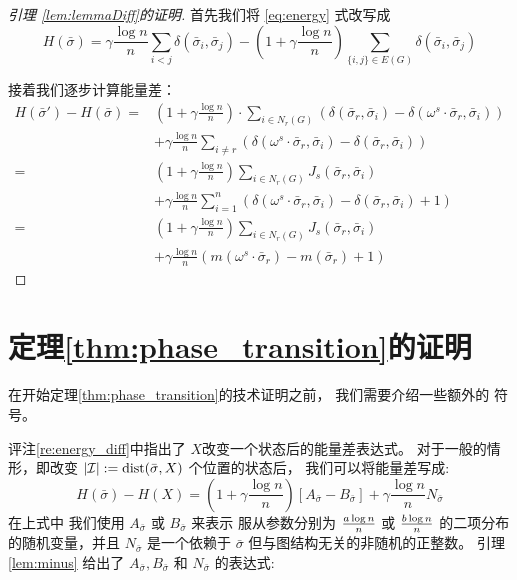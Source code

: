 \begin{proof}[引理 \ref{lem:lemmaDiff}的证明]
	首先我们将
  \eqref{eq:energy} 式改写成
	\begin{equation*}
	H(\bar{\sigma}) = \gamma \frac{\log n}{n} \sum_{i < j} \delta(\bar{\sigma}_i, \bar{\sigma}_j)
	- (1 + \gamma\frac{\log n}{n}) \sum_{ \{i, j\} \in E(G)} \delta(\bar{\sigma}_i, \bar{\sigma}_j)
	\end{equation*}
	
	接着我们逐步计算能量差：
  \begin{align*}
	H(\bar{\sigma}') - H(\bar{\sigma}) =& 
  \left(1 + \gamma\frac{\log n}{n}
  \right)
  \cdot \sum_{i \in N_r(G)} (\delta(\bar{\sigma}_r, \bar{\sigma}_i) -
	\delta(\omega^s \cdot \bar{\sigma}_r, \bar{\sigma}_i)) \\
	&+ \gamma \frac{\log n}{n}\sum_{i\neq r}
	( \delta(\omega^s \cdot \bar{\sigma}_r, \bar{\sigma}_i) -
	\delta( \bar{\sigma}_r, \bar{\sigma}_i) ) \\
	 =& \left(
     1 + \gamma\frac{\log n}{n}
     \right)
   \sum_{i \in N_r(G)} J_s(\bar{\sigma}_r, \bar{\sigma}_i) \\
	&+ \gamma \frac{\log n}{n}\sum_{i=1}^n
	( \delta(\omega^s \cdot \bar{\sigma}_r, \bar{\sigma}_i) -
	\delta( \bar{\sigma}_r, \bar{\sigma}_i) +1) \\
	=& \left(1+\gamma \frac{\log n}{n}
  \right)
  \sum_{i \in N_r(G)} J_s(\bar{\sigma}_r, \bar{\sigma}_i)\\
	&+ \gamma \frac{\log n}{n} (m(\omega^s \cdot \bar{\sigma}_r)-m(\bar{\sigma}_r)+1)
	\end{align*}
\end{proof}

\section{定理\ref{thm:phase_transition}的证明}
\label{sec:appendix_theorem_proof_phase_trans}

在开始定理\ref{thm:phase_transition}的技术证明之前，
我们需要介绍一些额外的
符号。

评注\ref{re:energy_diff}中指出了
$X$改变一个状态后的能量差表达式。
对于一般的情形，即改变
$|\mathcal{I}|:=\operatorname{dist}(\bar{\sigma}, X)$
个位置的状态后，
我们可以将能量差写成:
\begin{equation}\label{eq:Hgeneral}
H(\bar{\sigma}) - H(X)=
(1 + \gamma \frac{ \log n}{n})[A_{\bar{\sigma}} - B_{\bar{\sigma}}] + \gamma\frac{ \log n}{n} N_{\bar{\sigma}}
\end{equation}
在上式中 我们使用
$A_{\bar{\sigma}}$ 或
$B_{\bar{\sigma}}$ 来表示
服从参数分别为 $\frac{a \log n}{n}$ 或 $\frac{b \log n}{n}$ 的二项分布的随机变量，并且
$N_{\bar{\sigma}}$ 是一个依赖于 $\bar{\sigma}$ 但与图结构无关的非随机的正整数。
引理\ref{lem:minus} 给出了 $A_{\bar{\sigma}}, B_{\bar{\sigma}}$ 和 $N_{\bar{\sigma}}$
的表达式:

